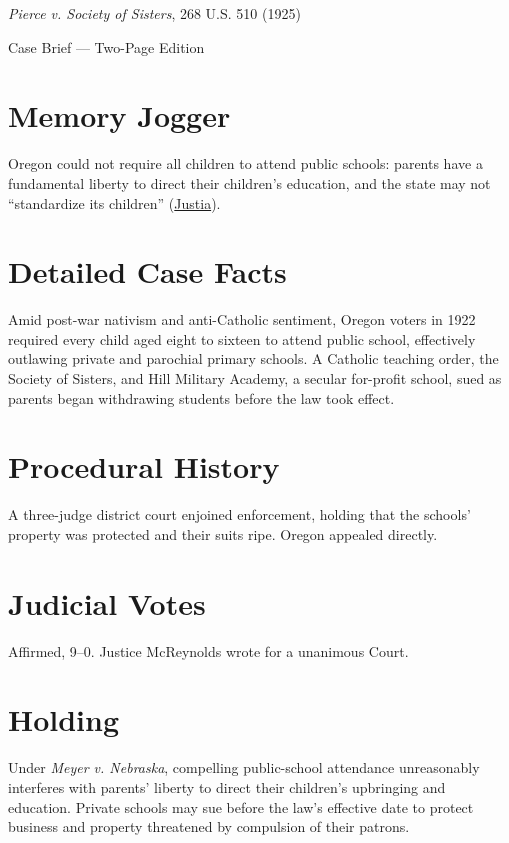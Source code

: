 \documentclass[12pt]{article}
\begin{document}
\begin{center}
{\LARGE \textit{Pierce v. Society of Sisters}, 268 U.S. 510 (1925)\par}
\vspace{0.5em}
{\large Case Brief --- Two-Page Edition\par}
\end{center}

\section{Memory Jogger}
Oregon could not require all children to attend public schools: parents have a fundamental liberty to direct their children's education, and the state may not ``standardize its children'' (\href{https://supreme.justia.com/cases/federal/us/268/510/}{Justia}).

\section{Detailed Case Facts}
Amid post-war nativism and anti-Catholic sentiment, Oregon voters in 1922 required every child aged eight to sixteen to attend public school, effectively outlawing private and parochial primary schools. A Catholic teaching order, the Society of Sisters, and Hill Military Academy, a secular for-profit school, sued as parents began withdrawing students before the law took effect.

\section{Procedural History}
A three-judge district court enjoined enforcement, holding that the schools' property was protected and their suits ripe. Oregon appealed directly.

\section{Judicial Votes}
Affirmed, 9--0. Justice McReynolds wrote for a unanimous Court.

\section{Holding}
Under \textit{Meyer v. Nebraska}, compelling public-school attendance unreasonably interferes with parents' liberty to direct their children's upbringing and education. Private schools may sue before the law's effective date to protect business and property threatened by compulsion of their patrons.
\end{document}
